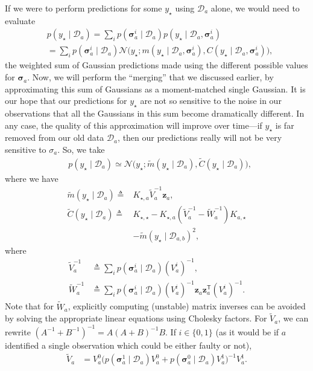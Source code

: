 \documentclass{article}
\newcommand{\given}{\ensuremath{\mid}}
\newcommand{\cm}[1]{\ensuremath{\mathcal{#1}}}
\newcommand{\bm}[1]{\ensuremath{\mathbf{#1}}}
\newcommand{\data}{\ensuremath{\cm{D}}}
\newcommand{\vect}[1]{\bm{#1}}
\newcommand{\vz}{\vect{z}}
\newcommand{\vs}{\vect{\sigma}}
\newcommand{\amean}[2]{\tilde{{m}}(#1 \given #2 )}
\newcommand{\acov}[2]{\tilde{{C}}(#1 \given #2 )}
\newcommand{\p}[2]{p(#1\given#2)}
\newcommand{\fPr}{p}
\newcommand{\Prob}[2]{\fPr(#1 \given #2 )}
\newcommand{\mean}[2]{{m}(#1\given#2)}
\newcommand{\cov}[2]{{C}(#1\given#2)}
\newcommand{\st}{_{\star}}
\newcommand{\tr}{\ensuremath{\mathsf{T}}}
\newcommand{\defequal}{\triangleq}
\begin{document}
If we were to perform predictions for some $y\st$ using $\data_a$
alone, we would need to evaluate
\begin{align*}
&\p{y\st}{\data_{a}} = \sum_{i} \Prob{\vs^i_{a}}{\data_a} \p{y\st}{\data_a, \vs^{i}_{a}}\nonumber\\
&=\sum_{i} \Prob{\vs^i_{a}}{\data_a} \cm{N}\bigl(y\st; \mean{y\st}{\data_a, \vs^{i}_{a}}, \cov{y\st}{\data_a, \vs^{i}_{a}}\bigr),
\end{align*}
the weighted sum of Gaussian predictions made using the different
possible values for $\vs_{a}$.  Now, we will perform the ``merging''
that we discussed earlier, by approximating this sum of Gaussians as a
moment-matched single Gaussian. It is our hope that our predictions
for $y\st$ are not so sensitive to the noise in our observations that
all the Gaussians in this sum become dramatically different. In any
case, the quality of this approximation will improve over time---if
$y\st$ is far removed from our old data $\data_a$, then our
predictions really will not be very sensitive to $\sigma_a$. So, we take
\begin{align*}
 &\p{y\st}{\data_{a}} \simeq \cm{N}\bigl(y\st; \amean{y\st}{\data_a}, \acov{y\st}{\data_a}\bigr),%
\end{align*}
where we have
\begin{align}
\amean{y\st}{\data_{a}} \defequal {}& K_{\star,a} \tilde{V}_a^{-1} \vz_a,\label{eq:ameana}\\
\acov{y\st}{\data_{a}}
\defequal {}& K_{\star,\star} - K_{\star,a}(\tilde{V}_a^{-1}-\tilde{W}_a^{-1})K_{a,\star} 
\nonumber\\
& - \amean{y\st}{\data_{a,b}}^2 ,\label{eq:acova}
\end{align}
where
\begin{align}
 \tilde{V}_a^{-1}  & \defequal \sum_i \Prob{\vs^i_{a}}{\data_a} (V_a^i)^{-1},\nonumber\\
 \tilde{W}_a^{-1} & \defequal \sum_i \Prob{\vs^i_{a}}{\data_a} (V_a^i)^{-1}\vz_a \vz_a^\tr (V_a^i)^{-1}.\label{eq:Wa}
\end{align}
Note that for $\tilde{W}_a$, explicitly computing (unstable) matrix
inverses can be avoided by solving the appropriate linear equations
using Cholesky factors.  For $\tilde{V}_a$, we can rewrite
$(A^{-1}+B^{-1})^{-1} = A (A+B)^{-1} B$. If $i\in\{0,1\}$ (as it would
be if $a$ identified a single observation which could be either faulty
or not),
\begin{align} \label{eq:inverse_trick}
\tilde{V}_a & = V^0_a\bigl(
\Prob{\vs^1_{a}}{\data_a} V^0_a 
+ 
\Prob{\vs^0_{a}}{\data_a} V^1_a
\bigr)^{-1}V^1_a.
\end{align}
\end{document}
